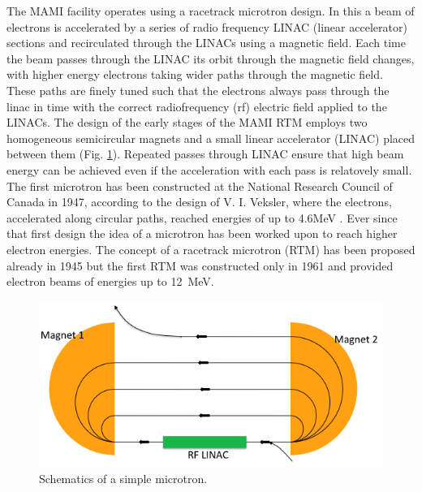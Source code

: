 \indent The MAMI facility operates using a racetrack microtron design.  In this a beam of electrons is accelerated by a series of radio frequency LINAC (linear accelerator) sections and recirculated through the LINACs using a magnetic field. Each time the beam passes through the LINAC its orbit through the magnetic field changes, with higher energy electrons taking wider paths through the magnetic field. These paths are finely tuned such that the electrons always pass through the linac in time with the correct radiofrequency (rf) electric field applied to the LINACs.  The design of the early stages of the MAMI RTM employs two homogeneous semicircular magnets and a small linear accelerator (LINAC) placed between them (Fig. \ref{microtronplot}).
Repeated passes through LINAC ensure that high beam energy can be achieved even if the acceleration with each pass is relatovely small. The first microtron has been constructed at the National Research Council of Canada in 1947, according to the design of V. I. Veksler, where the electrons, accelerated along circular paths, reached energies of up to 4.6MeV \cite{dehn}. Ever since that first design the idea of a microtron has been worked upon to reach higher electron energies. The concept of a  racetrack microtron (RTM) has been proposed already in 1945 but the first RTM was constructed only in 1961 and provided electron beams of energies up to 12~MeV. 
\begin{figure}[H]
\begin{center}
\includegraphics[scale=0.55]{pictures/png/rfm.png}
\caption{Schematics of a simple microtron.}
\label{microtronplot}
\end{center}
\end{figure}

